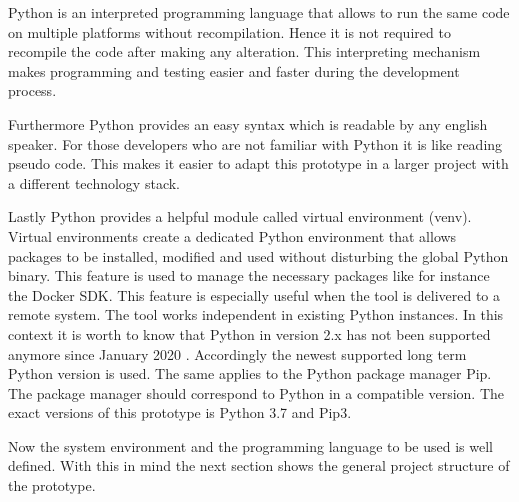 Python is an interpreted programming language that allows to run the same code on multiple platforms without recompilation. 
Hence it is not required to recompile the code after making any alteration. 
This interpreting mechanism makes programming and testing easier and faster during the development process.

Furthermore Python provides an easy syntax which is readable by any english speaker. 
For those developers who are not familiar with Python it is like reading pseudo code. 
This makes it easier to adapt this prototype in a larger project with a different technology stack.

Lastly Python provides a helpful module called virtual environment (venv). 
Virtual environments create a dedicated Python environment that allows packages to be installed, modified and used without disturbing the global Python binary. 
This feature is used to manage the necessary packages like for instance the Docker SDK. 
This feature is especially useful when the tool is delivered to a remote system. 
The tool works independent in existing Python instances. 
In this context it is worth to know that Python in version 2.x has not been supported anymore since January 2020 \cite{python_deprecated}. 
Accordingly the newest supported long term Python version is used. 
The same applies to the Python package manager Pip. 
The package manager should correspond to Python in a compatible version. 
The exact versions of this prototype is Python 3.7 and Pip3.

Now the system environment and the programming language to be used is well defined. 
With this in mind the next section shows the general project structure of the prototype.